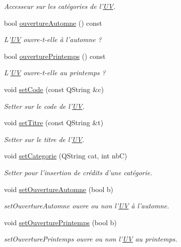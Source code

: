 \begin{DoxyCompactItemize}
\begin{DoxyCompactList}\small\item\em Accesseur sur les catégories de l'\hyperlink{class_u_v}{U\+V}. \end{DoxyCompactList}\item 
bool \hyperlink{class_u_v_a29423fb485037fc882b8b29cae033c9a}{ouverture\+Automne} () const 
\begin{DoxyCompactList}\small\item\em L'\hyperlink{class_u_v}{U\+V} ouvre-\/t-\/elle à l'automne ? \end{DoxyCompactList}\item 
bool \hyperlink{class_u_v_adca45078b74fdc3c09621a521756e8af}{ouverture\+Printemps} () const 
\begin{DoxyCompactList}\small\item\em L'\hyperlink{class_u_v}{U\+V} ouvre-\/t-\/elle au printemps ? \end{DoxyCompactList}\item 
void \hyperlink{class_u_v_a9c3b73077819774423559abd838e410b}{set\+Code} (const Q\+String \&c)
\begin{DoxyCompactList}\small\item\em Setter sur le code de l'\hyperlink{class_u_v}{U\+V}. \end{DoxyCompactList}\item 
void \hyperlink{class_u_v_a52c66013e137689883802465596bb688}{set\+Titre} (const Q\+String \&t)
\begin{DoxyCompactList}\small\item\em Setter sur le titre de l'\hyperlink{class_u_v}{U\+V}. \end{DoxyCompactList}\item 
void \hyperlink{class_u_v_a6310e1d779721ce541aaea845f205dd1}{set\+Categorie} (Q\+String cat, int nb\+C)
\begin{DoxyCompactList}\small\item\em Setter pour l'insertion de crédits d'une catégorie. \end{DoxyCompactList}\item 
void \hyperlink{class_u_v_a7e670e649febebe0fe70c3ce79f4be63}{set\+Ouverture\+Automne} (bool b)
\begin{DoxyCompactList}\small\item\em set\+Ouverture\+Automne ouvre ou non l'\hyperlink{class_u_v}{U\+V} à l'automne. \end{DoxyCompactList}\item 
void \hyperlink{class_u_v_a0ae246826809cc48a1999ec0671c78b3}{set\+Ouverture\+Printemps} (bool b)
\begin{DoxyCompactList}\small\item\em set\+Ouverture\+Printemps ouvre ou non l'\hyperlink{class_u_v}{U\+V} au printemps. \end{DoxyCompactList}\end{DoxyCompactItemize}
